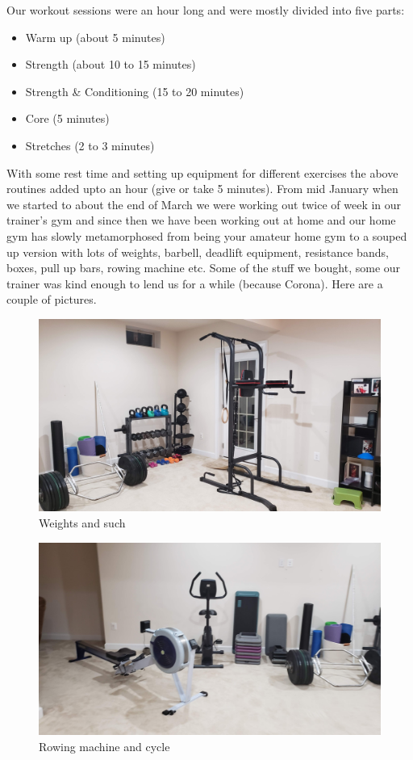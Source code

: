 \documentclass[
  oneside]{book}
\providecommand{\tightlist}{%
  \setlength{\itemsep}{0pt}\setlength{\parskip}{0pt}}
\begin{document}
Our workout sessions were an hour long and were mostly divided into five parts:

\begin{itemize}
\tightlist
\item
  Warm up (about 5 minutes)
\item
  Strength (about 10 to 15 minutes)
\item
  Strength \& Conditioning (15 to 20 minutes)
\item
  Core (5 minutes)
\item
  Stretches (2 to 3 minutes)
\end{itemize}

With some rest time and setting up equipment for different exercises the above routines added upto an hour (give or take 5 minutes). From mid January when we started to about the end of March we were working out twice of week in our trainer's gym and since then we have been working out at home and our home gym has slowly metamorphosed from being your amateur home gym to a souped up version with lots of weights, barbell, deadlift equipment, resistance bands, boxes, pull up bars, rowing machine etc. Some of the stuff we bought, some our trainer was kind enough to lend us for a while (because Corona). Here are a couple of pictures.

\begin{figure}
\centering
\includegraphics{pictures/gym2.jpg}
\caption{Weights and such}
\end{figure}

\begin{figure}
\centering
\includegraphics{pictures/gym1.jpg}
\caption{Rowing machine and cycle}
\end{figure}
\end{document}
